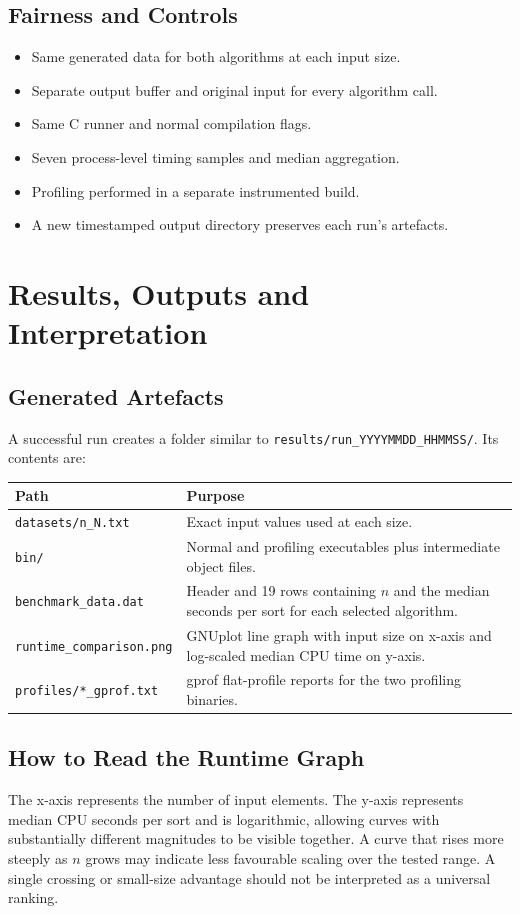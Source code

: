 \documentclass[12pt,a4paper,oneside]{report}
\begin{document}
\section{Fairness and Controls}
\begin{itemize}[leftmargin=*]
\item Same generated data for both algorithms at each input size.
\item Separate output buffer and original input for every algorithm call.
\item Same C runner and normal compilation flags.
\item Seven process-level timing samples and median aggregation.
\item Profiling performed in a separate instrumented build.
\item A new timestamped output directory preserves each run's artefacts.
\end{itemize}

\chapter{Results, Outputs and Interpretation}
\section{Generated Artefacts}
A successful run creates a folder similar to \texttt{results/run\_YYYYMMDD\_HHMMSS/}. Its contents are:
\begin{longtable}{p{}p{}}
\toprule\textbf{Path} & \textbf{Purpose}\\\midrule
\texttt{datasets/n\_N.txt} & Exact input values used at each size.\\
\texttt{bin/} & Normal and profiling executables plus intermediate object files.\\
\texttt{benchmark\_data.dat} & Header and 19 rows containing $n$ and the median seconds per sort for each selected algorithm.\\
\texttt{runtime\_comparison.png} & GNUplot line graph with input size on x-axis and log-scaled median CPU time on y-axis.\\
\texttt{profiles/*\_gprof.txt} & gprof flat-profile reports for the two profiling binaries.\\
\bottomrule\end{longtable}
\section{How to Read the Runtime Graph}
The x-axis represents the number of input elements. The y-axis represents median CPU seconds per sort and is logarithmic, allowing curves with substantially different magnitudes to be visible together. A curve that rises more steeply as $n$ grows may indicate less favourable scaling over the tested range. A single crossing or small-size advantage should not be interpreted as a universal ranking.
\end{document}
